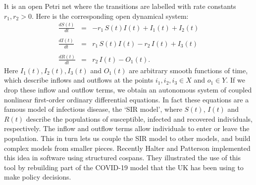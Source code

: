 \documentclass[reqno]{amsart}
\begin{document}
It is an open Petri net where the transitions are labelled with rate constants $r_1, r_2 > 0$.
Here is the corresponding open dynamical system:
\begin{equation}
\label{eq:openPetrir}
  \begin{array}{ccl} \displaystyle{\frac{dS(t)}{dt}} &=& -r_1 \, S(t)I(t)  + I_1(t) + I_2(t) \\ \\
\displaystyle{\frac{dI(t)}{dt}}  &=& r_1\, S(t)I(t) - r_2 \, I(t) + I_3(t)  \\  \\
\displaystyle{\frac{dR(t)}{dt}}  &=&   r_2 \, I(t)  - O_1(t).
\end{array}
\end{equation}
Here $I_1(t),I_2(t),I_3(t)$ and $O_1(t)$ are arbitrary smooth functions of time, which describe inflows and outflows at the points $i_1,i_2,i_3 \in X$ and $o_1 \in Y$.
If we drop these inflow and outflow terms, we obtain an autonomous system of coupled nonlinear first-order ordinary differential equations.   In fact these equations are a famous model of infectious disease, the `SIR model', where $S(t)$, $I(t)$ and $R(t)$ describe the populations of susceptible, infected and recovered individuals, respectively.   The inflow and outflow terms allow individuals to enter or leave the population.   This in turn lets us couple the SIR model to other models, and build complex models from smaller pieces.  
Recently Halter and Patterson \cite{HP} implemented this idea in software using structured cospans.  They illustrated the use of this tool by rebuilding part of the COVID-19 model that the UK has been using to make policy decisions.
\end{document}

